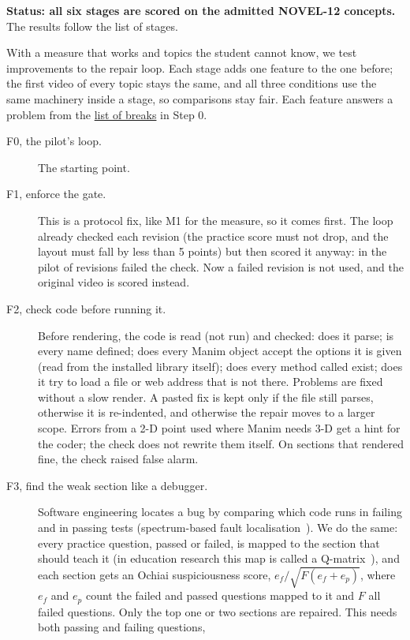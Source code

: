 \documentclass[11pt]{article}
\begin{document}
\textbf{Status: all six stages are scored on the admitted NOVEL-12 concepts.} The results follow the list of stages.

With a measure
that works and topics the student cannot know, we test improvements to the repair loop. Each stage
adds one feature to the one before; the first video of every topic stays the same, and all
three conditions use the same machinery inside a stage, so comparisons stay fair. Each feature answers a problem from the
\hyperref[sec:breaks]{list of breaks} in Step 0.

\begin{description}
  \item[F0, the pilot's loop.] The starting point.
  \item[F1, enforce the gate.] This is a protocol fix, like M1 for the measure, so it comes first. The loop already
  checked each revision (the practice score must not drop, and the layout must fall by less than 5 points) but then
  scored it anyway: in the pilot \PilotNotKept{} of \PilotRevisions{} revisions failed the
  check. Now a failed revision is not used, and the original video is scored instead.
  \item[F2, check code before running it.] Before rendering, the code is read (not run) and checked: does it parse;
  is every name defined; does every Manim object accept the options it is given (read from the installed library
  itself); does every method called exist; does it try to load a file or web address that is not there. Problems are
  fixed without a slow render. A pasted fix is kept only if the file still parses, otherwise it is re-indented, and
  otherwise the repair moves to a larger scope. Errors from a 2-D point used where Manim needs 3-D get a hint for the
  coder; the check does not rewrite them itself. On \PreflightN{} sections that rendered fine, the check raised
  \PreflightFP{} false alarm.
  \item[F3, find the weak section like a debugger.] Software engineering locates a bug by comparing which code runs
  in failing and in passing tests (spectrum-based fault localisation~\cite{tarantula,ochiai}). We do the same: every
  practice question, passed or failed, is mapped to the section that should teach it (in education research this map
  is called a Q-matrix~\cite{tatsuoka1983}), and each section gets an Ochiai suspiciousness score,
  $e_f / \sqrt{F(e_f + e_p)}$, where $e_f$ and $e_p$ count the failed and passed questions mapped to it and $F$ all
  failed questions. Only the top one or two sections are repaired. This needs both passing and failing questions,

\end{description}
\end{document}
